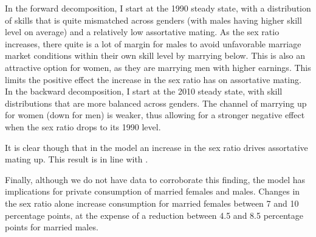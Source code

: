 \documentclass[12pt]{article}
\begin{document}
In the forward decomposition, I start at the 1990 steady state, with a distribution of skills that is quite mismatched across genders (with males having higher skill level on average) and a relatively low assortative mating. As the sex ratio increases, there quite is a lot of margin for males to avoid unfavorable marriage market conditions within their own skill level by marrying below. This is also an attractive option for women, as they are marrying men with higher earnings. This limits the positive effect the increase in the sex ratio has on assortative mating. In the backward decomposition, I start at the 2010 steady state, with skill distributions that are more balanced across genders. The channel of marrying up for women (down for men) is weaker, thus allowing for a stronger negative effect when the sex ratio drops to its 1990 level.

It is clear though that in the model an increase in the sex ratio drives assortative mating up. This result is in line with \cite{wang18}.

Finally, although we do not have data to corroborate this finding, the model has implications for private consumption of married females and males. Changes in the sex ratio alone increase consumption for married females between 7 and 10 percentage points, at the expense of a reduction between 4.5 and 8.5 percentage points for married males.  
\end{document}
